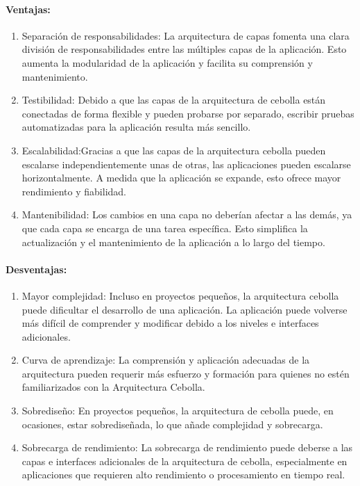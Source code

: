 \paragraph{Ventajas:}
\begin{enumerate}
    \item Separaci\'on de responsabilidades: La arquitectura de capas fomenta una clara división de responsabilidades entre las múltiples capas de la aplicación. Esto aumenta la modularidad de la aplicación y facilita su comprensión y mantenimiento.
    \item Testibilidad: Debido a que las capas de la arquitectura de cebolla están conectadas de forma flexible y pueden probarse por separado, escribir pruebas automatizadas para la aplicación resulta más sencillo.
    \item Escalabilidad:Gracias a que las capas de la arquitectura cebolla pueden escalarse independientemente unas de otras, las aplicaciones pueden escalarse horizontalmente. A medida que la aplicación se expande, esto ofrece mayor rendimiento y fiabilidad.
    \item Mantenibilidad: Los cambios en una capa no deberían afectar a las demás, ya que cada capa se encarga de una tarea específica. Esto simplifica la actualización y el mantenimiento de la aplicación a lo largo del tiempo.
\end{enumerate}

\paragraph{Desventajas:}
\begin{enumerate}
    \item Mayor complejidad: Incluso en proyectos pequeños, la arquitectura cebolla puede dificultar el desarrollo de una aplicación. La aplicación puede volverse más difícil de comprender y modificar debido a los niveles e interfaces adicionales.
    \item Curva de aprendizaje: La comprensión y aplicación adecuadas de la arquitectura pueden requerir más esfuerzo y formación para quienes no estén familiarizados con la Arquitectura Cebolla.
    \item Sobrediseño: En proyectos pequeños, la arquitectura de cebolla puede, en ocasiones, estar sobrediseñada, lo que añade complejidad y sobrecarga.
    \item Sobrecarga de rendimiento: La sobrecarga de rendimiento puede deberse a las capas e interfaces adicionales de la arquitectura de cebolla, especialmente en aplicaciones que requieren alto rendimiento o procesamiento en tiempo real.
\end{enumerate}

